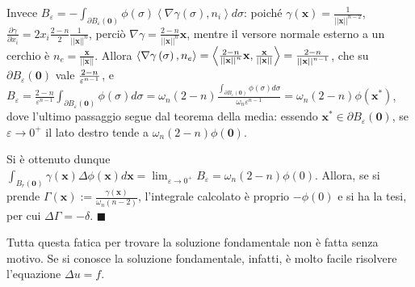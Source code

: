 \documentclass{article}
\begin{document}
Invece $B_{\varepsilon }=-\int_{\partial B_{\varepsilon }\left( \mathbf{0}%
\right) }\phi \left( \sigma \right) \left\langle \nabla \gamma \left( \sigma
\right) ,n_{i}\right\rangle d\sigma $: poich\'{e} $\gamma \left( \mathbf{x}%
\right) =\frac{1}{\left\vert \left\vert \mathbf{x}\right\vert \right\vert
^{n-2}}$, $\frac{\partial \gamma }{\partial x_{i}}=2x_{i}\frac{2-n}{2}\frac{1%
}{\left\vert \left\vert \mathbf{x}\right\vert \right\vert ^{n}}$, perci\`{o} 
$\nabla \gamma =\frac{2-n}{\left\vert \left\vert \mathbf{x}\right\vert
\right\vert ^{n}}\mathbf{x}$, mentre il versore normale esterno a un cerchio 
\`{e} $n_{e}=\frac{\mathbf{x}}{\left\vert \left\vert \mathbf{x}\right\vert
\right\vert }$. Allora $\left\langle \nabla \gamma \left( \sigma \right)
,n_{e}\right\rangle =\left\langle \frac{2-n}{\left\vert \left\vert \mathbf{x}%
\right\vert \right\vert ^{n}}\mathbf{x},\frac{\mathbf{x}}{\left\vert
\left\vert \mathbf{x}\right\vert \right\vert }\right\rangle =\frac{2-n}{%
\left\vert \left\vert \mathbf{x}\right\vert \right\vert ^{n-1}}$, che su $%
\partial B_{\varepsilon }\left( \mathbf{0}\right) $ vale $\frac{2-n}{%
\varepsilon ^{n-1}}$, e $B_{\varepsilon }=\frac{2-n}{\varepsilon ^{n-1}}%
\int_{\partial B_{\varepsilon }\left( \mathbf{0}\right) }\phi \left( \sigma
\right) d\sigma =\omega _{n}\left( 2-n\right) \frac{\int_{\partial
B_{\varepsilon }\left( \mathbf{0}\right) }\phi \left( \sigma \right) d\sigma 
}{\omega _{n}\varepsilon ^{n-1}}=\omega _{n}\left( 2-n\right) \phi \left( 
\mathbf{x}^{\ast }\right) $, dove l'ultimo passaggio segue dal teorema della
media: essendo $\mathbf{x}^{\ast }\in \partial B_{\varepsilon }\left( 
\mathbf{0}\right) $, se $\varepsilon \rightarrow 0^{+}$ il lato destro tende
a $\omega _{n}\left( 2-n\right) \phi \left( \mathbf{0}\right) $.

Si \`{e} ottenuto dunque $\int_{B_{r}\left( \mathbf{0}\right) }\gamma \left( 
\mathbf{x}\right) \Delta \phi \left( \mathbf{x}\right) d\mathbf{x}%
=\lim_{\varepsilon \rightarrow 0^{+}}B_{\varepsilon }=\omega _{n}\left(
2-n\right) \phi \left( 0\right) $. Allora, se si prende $\Gamma \left( 
\mathbf{x}\right) :=\frac{\gamma \left( \mathbf{x}\right) }{\omega
_{n}\left( n-2\right) }$, l'integrale calcolato \`{e} proprio $-\phi \left(
0\right) $ e si ha la tesi, per cui $\Delta \Gamma =-\delta $. $\blacksquare 
$

Tutta questa fatica per trovare la soluzione fondamentale non \`{e} fatta
senza motivo. Se si conosce la soluzione fondamentale, infatti, \`{e} molto
facile risolvere l'equazione $\Delta u=f$.
\end{document}
